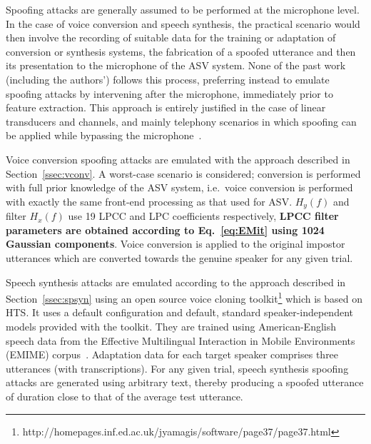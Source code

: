 
Spoofing attacks are generally assumed to be performed at the microphone level.
In the case of voice conversion and speech synthesis, the practical scenario would then involve the recording of suitable data for the training or adaptation of conversion or synthesis systems, the fabrication of a spoofed utterance and then its presentation to the microphone of the ASV system.
None of the past work (including the authors') follows this process, preferring instead to emulate spoofing attacks by intervening after the microphone, immediately prior to feature extraction.
This approach is entirely justified in the case of linear transducers and channels, and mainly telephony scenarios in which spoofing can be applied while bypassing the microphone~\cite{handbookChapter}.

Voice conversion spoofing attacks are emulated with the approach described in Section~\ref{ssec:vconv}. 
A worst-case scenario is considered; conversion is performed with full prior knowledge of the ASV system, i.e.\ voice conversion is performed with exactly the same front-end processing as that used for ASV.
$H_y(f)$ and filter $H_x(f)$ use 19 LPCC and LPC coefficients respectively, {\bfseries LPCC filter parameters are obtained according to Eq.~\ref{eq:EMit} using 1024 Gaussian components}.
Voice conversion is applied to the original impostor utterances which are converted towards the genuine speaker for any given trial.

Speech synthesis attacks are emulated according to the approach described in Section~\ref{ssec:spsyn} using an open source voice cloning toolkit\footnote{http://homepages.inf.ed.ac.uk/jyamagis/software/page37/page37.html} which is based on HTS.  It uses  a default configuration and default, standard speaker-independent models provided with the toolkit.  They are trained using American-English speech data from the Effective Multilingual Interaction in Mobile Environments (EMIME) corpus~\cite{Wester2010}.   
Adaptation data for each target speaker comprises three utterances (with transcriptions).  
For any given trial, speech synthesis spoofing attacks are generated using arbitrary text, thereby producing a spoofed utterance of duration close to that of the average test utterance.
